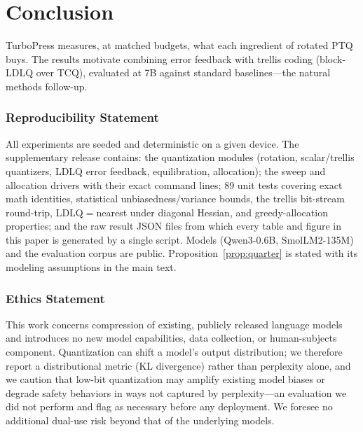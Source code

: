 \documentclass[10pt]{article}
\begin{document}
\section{Conclusion}
TurboPress measures, at matched budgets, what each ingredient of rotated PTQ
buys. The results motivate combining error feedback with trellis coding
(block-LDLQ over TCQ), evaluated at 7B against standard baselines---the natural
methods follow-up.

\subsubsection*{Reproducibility Statement}
All experiments are seeded and deterministic on a given device. The supplementary
release contains: the quantization modules (rotation, scalar/trellis quantizers,
LDLQ error feedback, equilibration, allocation); the sweep and allocation drivers
with their exact command lines; $89$ unit tests covering exact math identities,
statistical unbiasedness/variance bounds, the trellis bit-stream round-trip,
LDLQ$=$nearest under diagonal Hessian, and greedy-allocation properties; and the
raw result JSON files from which every table and figure in this paper is
generated by a single script. Models (Qwen3-0.6B, SmolLM2-135M) and the
evaluation corpus are public. Proposition~\ref{prop:quarter} is stated with its
modeling assumptions in the main text.

\subsubsection*{Ethics Statement}
This work concerns compression of existing, publicly released language models and
introduces no new model capabilities, data collection, or human-subjects
component. Quantization can shift a model's output distribution; we therefore
report a distributional metric (KL divergence) rather than perplexity alone, and
we caution that low-bit quantization may amplify existing model biases or
degrade safety behaviors in ways not captured by perplexity---an evaluation we
did not perform and flag as necessary before any deployment. We foresee no
additional dual-use risk beyond that of the underlying models.




\appendix
\end{document}
